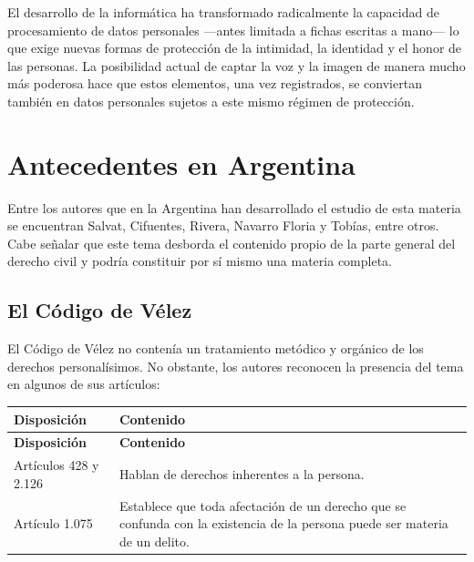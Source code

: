 \documentclass[12pt,oneside]{book}
\begin{document}
\begin{important}
El desarrollo de la informática ha transformado radicalmente la capacidad de procesamiento de datos personales —antes limitada a fichas escritas a mano— lo que exige nuevas formas de protección de la intimidad, la identidad y el honor de las personas. La posibilidad actual de captar la voz y la imagen de manera mucho más poderosa hace que estos elementos, una vez registrados, se conviertan también en datos personales sujetos a este mismo régimen de protección.
\end{important}

\section{Antecedentes en Argentina}

Entre los autores que en la Argentina han desarrollado el estudio de esta materia se encuentran Salvat, Cifuentes, Rivera, Navarro Floria y Tobías, entre otros. Cabe señalar que este tema desborda el contenido propio de la parte general del derecho civil y podría constituir por sí mismo una materia completa.


\subsection{El Código de Vélez}

El Código de Vélez no contenía un tratamiento metódico y orgánico de los derechos personalísimos. No obstante, los autores reconocen la presencia del tema en algunos de sus artículos:

\begin{longtable}{p{} p{}}
\toprule
\textbf{Disposición} & \textbf{Contenido} \\
\midrule
\endfirsthead
\toprule
\textbf{Disposición} & \textbf{Contenido} \\
\midrule
\endhead
Artículos 428 y 2.126 & Hablan de derechos inherentes a la persona. \\
\addlinespace
Artículo 1.075 & Establece que toda afectación de un derecho que se confunda con la existencia de la persona puede ser materia de un delito. \\
\bottomrule
\end{longtable}
\end{document}
